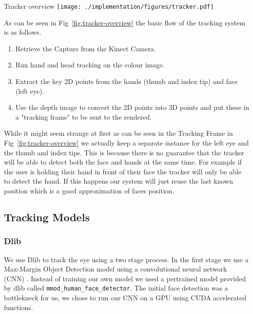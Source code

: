 \begin{figureBox}[label={fig:tracker-overview}, width=0.8\linewidth]{Tracker overview}
    \texttt{[image: ./implementation/figures/tracker.pdf]}
\end{figureBox}

As can be seen in Fig~\ref{fig:tracker-overview} the basic flow of the tracking system is as follows.
\begin{enumerate}[itemsep=-0.25em]
	\item Retrieve the Capture from the Kinect Camera.
	\item Run hand and head tracking on the colour image.
	\item Extract the key 2D points from the hands (thumb and index tip) and face (left eye).
	\item Use the depth image to convert the 2D points into 3D points and put these in a "tracking frame" to be sent to the rendered.
\end{enumerate}

While it might seem strange at first as can be seen in the Tracking Frame in Fig~\ref{fig:tracker-overview} we actually keep a separate instance for the left eye and the thumb and index tips. This is because there is no guarantee that the tracker will be able to detect both the face and hands at the same time. For example if the user is holding their hand in front of their face the tracker will only be able to detect the hand. If this happens our system will just reuse the last known position which is a good approximation of faces position. 

\subsection{Tracking Models}
\subsubsection{Dlib}

We use Dlib to track the eye using a two stage process. In the first stage we use a Max-Margin Object Detection model \tocite \tocite  using a convolutional neural network (CNN) \tocite. Instead of training our own model we used a pertrained model provided by dlib \tocite called \texttt{mmod\_human\_face\_detector}. The initial face detection was a bottlekneck for us, we chose to run our CNN on a GPU using CUDA accelerated functions. \\
 
